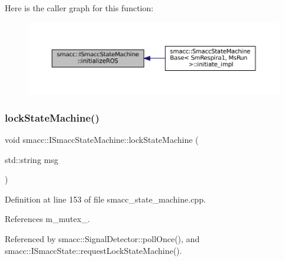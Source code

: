 Here is the caller graph for this function\+:
\nopagebreak
\begin{figure}[H]
\begin{center}
\leavevmode
\includegraphics[width=350pt]{classsmacc_1_1ISmaccStateMachine_a1136dd5d81e846ac86de48bc71912cbf_icgraph}
\end{center}
\end{figure}
\mbox{\label{classsmacc_1_1ISmaccStateMachine_a5c8d4c9a4b11c7950266a00e48080ce3}} 
\subsubsection{\texorpdfstring{lock\+State\+Machine()}{lockStateMachine()}}
{\footnotesize\ttfamily void smacc\+::\+I\+Smacc\+State\+Machine\+::lock\+State\+Machine (\begin{DoxyParamCaption}\item[{std\+::string}]{msg }\end{DoxyParamCaption})\hspace{0.3cm}{\ttfamily [private]}}



Definition at line 153 of file smacc\+\_\+state\+\_\+machine.\+cpp.



References m\+\_\+mutex\+\_\+.



Referenced by smacc\+::\+Signal\+Detector\+::poll\+Once(), and smacc\+::\+I\+Smacc\+State\+::request\+Lock\+State\+Machine().


